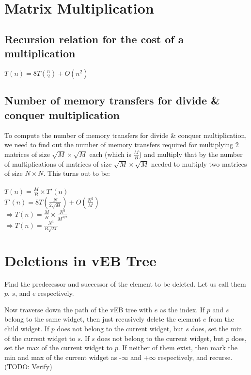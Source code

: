 \documentclass{article}
\begin{document}
\clearpage

\section{Matrix Multiplication}

\subsection{Recursion relation for the cost of a multiplication}

$T(n) = 8T(\frac{n}{2}) + O(n^2)$\\

\subsection{Number of memory transfers for divide \& conquer
  multiplication}

To compute the number of memory transfers for divide \& conquer
multiplication, we need to find out the number of memory transfers
required for multiplying 2 matrices of size $\sqrt{M} \times \sqrt{M}$
each (which is $\frac{M}{B}$) and multiply that by the number of
multiplications of matrices of size $\sqrt{M} \times \sqrt{M}$ needed
to multiply two matrices of size $N \times N$. This turns out to be:\\
\\
$T(n) = \frac{M}{B} \times T'(n)$\\
$T'(n) = 8T(\frac{N}{2\sqrt{M}}) + O(\frac{N^2}{M})$\\
$\Rightarrow T(n) = \frac{M}{B} \times \frac{N^3}{M^{3/2}}$\\
$\Rightarrow T(n) = \frac{N^3}{B\sqrt{M}}$


\clearpage

\section{Deletions in vEB Tree}
Find the predecessor and successor of the element to be deleted. Let us call them $p$, $s$,
and $e$ respectively. 

Now traverse down the path of the vEB tree with $e$ as the index. If $p$ and $s$ belong to the
same widget, then just recusively delete the element $e$ from the child widget. If $p$ does not
belong to the current widget, but $s$ does, set the min of the current widget to $s$. If $s$ does
not belong to the current widget, but $p$ does, set the max of the current widget to $p$. If 
neither of them exist, then mark the min and max of the current widget as -$\infty$ and +$\infty$
respectively, and recurse. 
(TODO: Verify)
\end{document}
